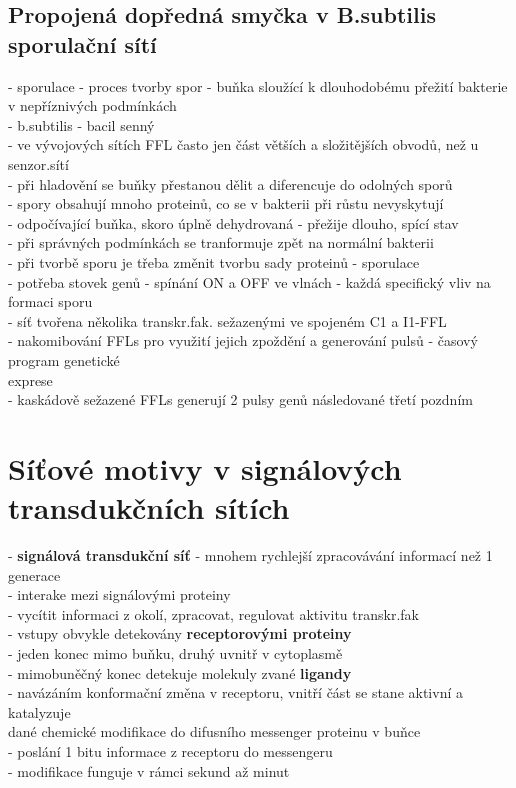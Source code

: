 \documentclass[11pt,a4paper]{report}
\begin{document}
\subsection{Propojená dopředná smyčka v B.subtilis sporulační sítí}
- sporulace - proces tvorby spor - buňka sloužící k dlouhodobému přežití bakterie v nepříznivých podmínkách\\ 
- b.subtilis - bacil senný\\
- ve vývojových sítích FFL často jen část větších a složitějších obvodů, než u senzor.sítí\\
- při hladovění se buňky přestanou dělit a diferencuje do odolných sporů\\
\indent - spory obsahují mnoho proteinů, co se v bakterii při růstu nevyskytují\\
\indent - odpočívající buňka, skoro úplně dehydrovaná - přežije dlouho, spící stav\\
\indent - při správných podmínkách se tranformuje zpět na normální bakterii\\
- při tvorbě sporu je třeba změnit tvorbu sady proteinů - sporulace\\
\indent - potřeba stovek genů - spínání ON a OFF ve vlnách - každá specifický vliv na formaci sporu\\
\indent - síť tvořena několika transkr.fak. sežazenými ve spojeném C1 a I1-FFL\\
\indent - nakomibování FFLs pro využití jejich zpoždění a generování pulsů - časový program genetické\\
\indent \indent exprese\\
\indent - kaskádově sežazené FFLs generují 2 pulsy genů následované třetí pozdním\\

\section{Síťové motivy v signálových transdukčních sítích}
- \textbf{signálová transdukční síť} - mnohem rychlejší zpracovávání informací než 1 generace\\
- interake mezi signálovými proteiny\\
- vycítit informaci z okolí, zpracovat, regulovat aktivitu transkr.fak\\
- vstupy obvykle detekovány \textbf{receptorovými proteiny}\\
\indent - jeden konec mimo buňku, druhý uvnitř v cytoplasmě\\
\indent \indent - mimobuněčný konec detekuje molekuly zvané \textbf{ligandy}\\
\indent \indent \indent - navázáním konformační změna v receptoru, vnitří část se stane aktivní a katalyzuje\\ \indent \indent \indent \indent dané chemické modifikace do difusního messenger proteinu v buňce\\
\indent \indent \indent \indent - poslání 1 bitu informace z receptoru do messengeru\\
\indent \indent \indent - modifikace funguje v rámci sekund až minut\\
\end{document}
